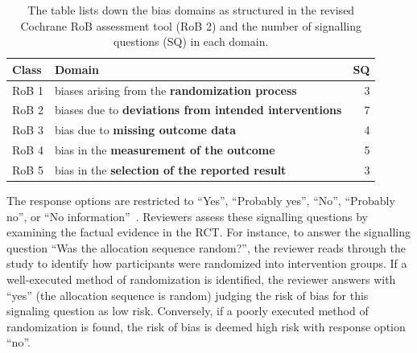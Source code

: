\documentclass[sn-mathphys,Numbered]{sn-jnl}%
\theoremstyle{thmstyleone}%
\theoremstyle{thmstyletwo}%
\theoremstyle{thmstylethree}%
\begin{document}
%
%
%
\begin{table}
 \centering
   \caption{The table lists down the bias domains as structured in the revised Cochrane RoB assessment tool (RoB 2) and the number of signalling questions (SQ) in each domain.}\label{tab:robdomains}
    \begin{tabular}{llr}
    \toprule
     Class & Domain & SQ\\
    \midrule
    RoB 1 & biases arising from the \textbf{randomization process} &  3\\
    RoB 2 & biases due to \textbf{deviations from intended interventions} & 7\\
    RoB 3 & bias due to \textbf{missing outcome data} & 4\\
    RoB 4 & bias in the \textbf{measurement of the outcome} & 5\\
    RoB 5 & bias in the \textbf{selection of the reported result} & 3\\
    \bottomrule
    \end{tabular}
\end{table}
%
%
%


The response options are restricted to ``Yes'', ``Probably yes'', ``No'', ``Probably no'', or ``No information''~\cite{sterne2019rob}.
Reviewers assess these signalling questions by examining the factual evidence in the RCT.
For instance, to answer the signalling question ``Was the allocation sequence random?'', the reviewer reads through the study to identify how participants were randomized into intervention groups.
If a well-executed method of randomization is identified, the reviewer answers with ``yes'' (the allocation sequence is random) judging the risk of bias for this signaling question as low risk.
Conversely, if a poorly executed method of randomization is found, the risk of bias is deemed  high risk with response option ``no''.
\end{document}
